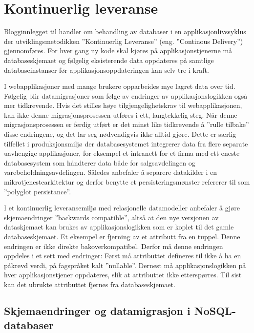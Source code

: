 \section{Kontinuerlig leveranse}

Blogginnlegget til \cite{hauer2015} handler om behandling av databaser i en applikasjonlivssyklus der utviklingsmetodikken ''Kontinuerlig Leveranse'' (eng. ''Continous Delivery'') gjennomføres. For hver gang ny kode skal kjøres på applikasjonstjenerne må databaseskjemaet og følgelig eksisterende data oppdateres på samtlige databaseinstanser før applikasjonsoppdateringen kan selv tre i kraft.

I webapplikasjoner med mange brukere opparbeides mye lagret data over tid. Følgelig blir datamigrasjoner som følge av endringer av applikasjonslogikken også mer tidkrevende. Hvis det stilles høye tilgjengelighetskrav til webapplikasjonen, kan ikke denne migrasjonsprosessen utføres i ett, langtekkelig steg. Når denne migrasjonsprosessen er ferdig utført er det minst like tidkrevende å ''rulle tilbake'' disse endringene, og det lar seg nødvendigvis ikke alltid gjøre. Dette er særlig tilfellet i produksjonsmiljø der databasesystemet integrerer data fra flere separate uavhengige applikasjoner, for eksempel et intranett for et firma med ett eneste databasesystem som håndterer data både for salgsavdelingen og varebeholdningsavdelingen. Således anbefaler \cite{hauer2015} å separere datakilder i en mikrotjenestearkitektur og derfor benytte et persisteringsmønster \cite{sadalage2013} refererer til som ''polyglot persistance''.

I et kontinuerlig leveransemiljø med relasjonelle datamodeller anbefaler \cite{hauer2015} å gjøre skjemaendringer ''backwards compatible'', altså at den nye versjonen av dataskjemaet kan brukes av applikasjonslogikken som er koplet til det gamle databaseskjemaet. Et eksempel er fjerning av et attributt fra en tuppel. Denne endringen er ikke direkte bakoverkompatibel. Derfor må denne endringen oppdeles i et sett med endringer: Først må attributtet defineres til ikke å ha en påkrevd verdi, på fagspråket kalt ''nullable''. Dernest må applikasjonslogikken på hver applikasjonstjener oppdateres, slik at attributtet ikke etterspørres. Til sist kan det ubrukte attributtet fjernes fra databaseskjemaet.

\subsection{Skjemaendringer og datamigrasjon i NoSQL-databaser}

